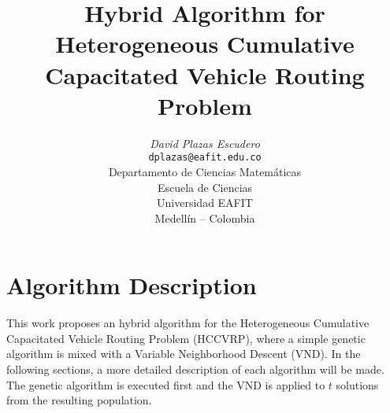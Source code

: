\documentclass[10pt,twoside]{article}
\title{Hybrid Algorithm for Heterogeneous Cumulative Capacitated Vehicle Routing Problem}
\author{\emph{David Plazas Escudero}\\
\vspace{0.3cm}
\small{\tt{dplazas@eafit.edu.co}}\\
Departamento de Ciencias Matemáticas\\
Escuela de Ciencias\\
Universidad EAFIT\\
Medellín -- Colombia}
\date{}
\begin{document}
\maketitle

\thispagestyle{firststyle}


\section{Algorithm Description}\label{sec_intro}
This work proposes an hybrid algorithm for the Heterogeneous Cumulative Capacitated Vehicle Routing Problem (HCCVRP), where a simple genetic algorithm is mixed with a Variable Neighborhood Descent (VND). In the following sections, a more detailed description of each algorithm will be made. The genetic algorithm is executed first and the VND is applied to $t$ solutions from the resulting population.
\end{document}
